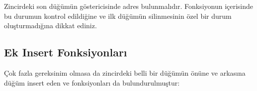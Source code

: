\documentclass[a4paper,10pt,turkish]{sphinxmanual}
\begin{document}
\sphinxAtStartPar
Zincirdeki son düğümün  göstericisinde  adres bulunmalıdır. Fonksiyonun
içerisinde bu durumun kontrol edildiğine ve ilk düğümün silinmesinin özel bir durum
oluşturmadığına dikkat ediniz.


\subsection{Ek Insert Fonksiyonları}
\label{\detokenize{kernellinkedlistandhashtable:ek-insert-fonksiyonlari}}
\sphinxAtStartPar
Çok fazla gereksinim olmasa da zincirdeki belli bir düğümün önüne ve arkasına düğüm insert
eden  ve  fonksiyonları da bulundurulmuştur:
\end{document}
